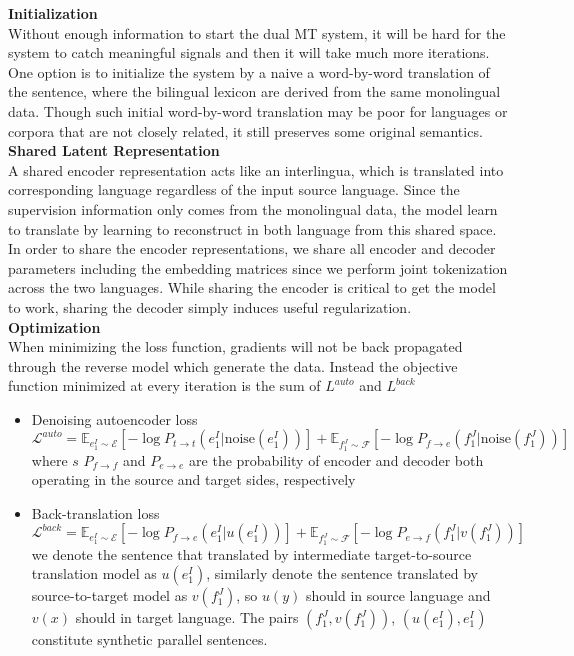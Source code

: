 \textbf{Initialization}\\
Without enough information to start the dual MT system, it will be hard for the system to catch meaningful signals and then it will take much more iterations. One option is to initialize the system by a naive a word-by-word translation of the sentence, where the bilingual lexicon are derived from the same monolingual data. Though such initial word-by-word translation may be poor for languages or corpora that are not closely related, it still preserves some  original semantics.\\


\textbf{Shared Latent Representation} \\
A shared encoder representation acts like an interlingua, which is translated into corresponding language regardless of the input source language. Since the  supervision information only comes from the monolingual data, the model learn to translate by learning to reconstruct in both language from this shared space.\\
In order to share the encoder representations, we share all encoder and decoder parameters including the embedding matrices since we perform joint tokenization across the two languages. While sharing the encoder is critical to get the model to work, sharing the decoder simply induces useful regularization.\\



\textbf{Optimization}\\
When minimizing the loss function, gradients will not be back propagated through the reverse model which generate the data. Instead the objective function minimized at every iteration is the sum of $L^{auto}$ and $L^{back}$
\begin{itemize}
	\item Denoising autoencoder loss
	\[ \mathcal{L}^{auto} = \mathbb{E}_{e_1^I \sim \mathcal{E}}[-\log P_{t\rightarrow t}(e_1^I|\text{noise}(e_1^I))] + \mathbb{E}_{f_1^J\sim \mathcal{F}} [-\log P_{f\rightarrow e}(f_1^J|\text{noise}(f_1^J))]\]
	where $s$ $P_{f\rightarrow f}$ and $P_{e\rightarrow e}$ are the probability of encoder and decoder both operating in the source and target sides, respectively
	\item Back-translation loss
	\[ \mathcal{L}^{back} = \mathbb{E}_{e_1^I\sim \mathcal{E}} [-\log P_{f\rightarrow e}(e_1^I|u(e_1^I))] +  \mathbb{E}_{f_1^J\sim \mathcal{F}} [-\log P_{e\rightarrow f}(f_1^J|v(f_1^J))]\]
	 we denote the sentence that translated by intermediate target-to-source translation model as $u(e_1^I)$, similarly denote the sentence translated by source-to-target model as $v(f_1^J)$, so $u(y)$ should in source language and $v(x)$ should in target language. The pairs $(f_1^J, v(f_1^J))$, $(u(e_1^I), e_1^I)$ constitute synthetic parallel  sentences.
\end{itemize}











